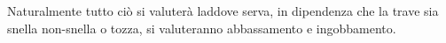		
		Naturalmente tutto ciò si valuterà laddove serva, in dipendenza che la trave sia snella non-snella o tozza, si valuteranno abbassamento e ingobbamento. 




%
%
%		
%		
%		
%		
%		
%		
%		
%
